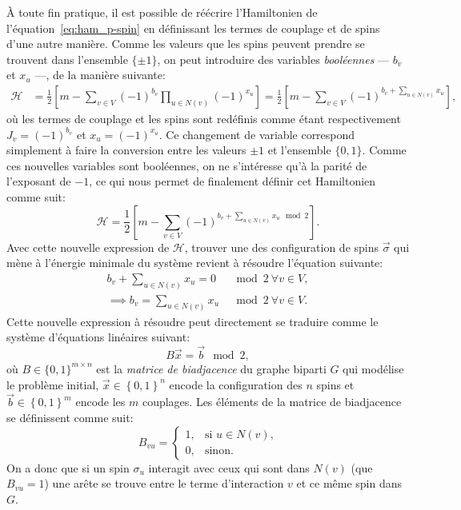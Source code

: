 À toute fin pratique, il est possible de réécrire l'Hamiltonien de l'équation~\ref{eq:ham_p-spin} en définissant les termes de couplage et de spins d'une autre manière.
Comme les valeurs que les spins peuvent prendre se trouvent dans l'ensemble $\{\pm 1\}$, on peut introduire des variables \emph{booléennes} --- $b_v$ et $x_u$ ---, de la manière suivante:
\begin{equation}\label{eq:new_ham_p-spin1}
    \begin{split}
        \mathcal{H} &= \frac{1}{2} \left[m -\sum_{v \in V} (-1)^{b_v}\prod_{u \in N(v)} (-1)^{x_u} \right] = \frac{1}{2} \left[m -\sum_{v \in V} (-1)^{b_v + \sum_{u \in N(v)} x_u} \right],
    \end{split}
\end{equation}
où les termes de couplage et les spins sont redéfinis comme étant respectivement $J_v = (-1)^{b_v}$ et $x_u = (-1)^{x_u}$.
Ce changement de variable correspond simplement à faire la conversion entre les valeurs $\pm 1$ et l'ensemble $\{0, 1\}$.
Comme ces nouvelles variables sont booléennes, on ne s'intéresse qu'à la parité de l'exposant de $-1$, ce qui nous permet de finalement définir cet Hamiltonien comme suit:
\begin{equation} \label{eq:new_ham_p-spin2}
    \mathcal{H} = \frac{1}{2} \left[m -\sum_{v \in V} (-1)^{b_v + \sum_{u \in N(v)} x_u\mod{2}} \right].
\end{equation}
Avec cette nouvelle expression de $\mathcal{H}$, trouver une des configuration de spins $\vec{\sigma}$ qui mène à l'énergie minimale du système revient à résoudre l'équation suivante:
\begin{equation}
    \begin{split}
        b_v + \sum_{u \in N(v)} x_u = 0 &\mod{2}\ \forall v \in V,\\
        \implies b_v = \sum_{u \in N(v)} x_u &\mod{2}\ \forall v \in V.
    \end{split}
\end{equation}
Cette nouvelle expression à résoudre peut directement se traduire comme le système d'équations linéaires suivant:
\begin{equation} \label{eq:Bx=b}
    B\vec{x} = \vec{b} \mod 2,
\end{equation}
où $B \in \{0, 1\}^{m \times n}$ est la \emph{matrice de biadjacence} du graphe biparti $G$ qui modélise le problème initial, $\vec{x} \in \left\{ 0,1 \right\}^n$ encode la configuration des $n$ spins et $\vec{b} \in \left\{ 0,1 \right\}^m$ encode les $m$ couplages.
Les éléments de la matrice de biadjacence se définissent comme suit:
\begin{equation}\label{eq:biadjacency-matrix}
    B_{vu} = 
    \begin{cases}
            1, & \text{si $u \in N(v)$,}\\
            0, & \text{sinon.}
    \end{cases}
\end{equation}
On a donc que si un spin $\sigma_u$ interagit avec ceux qui sont dans $N(v)$ (que $B_{vu} = 1$) une arête se trouve entre le terme d'interaction $v$ et ce même spin dans $G$.

